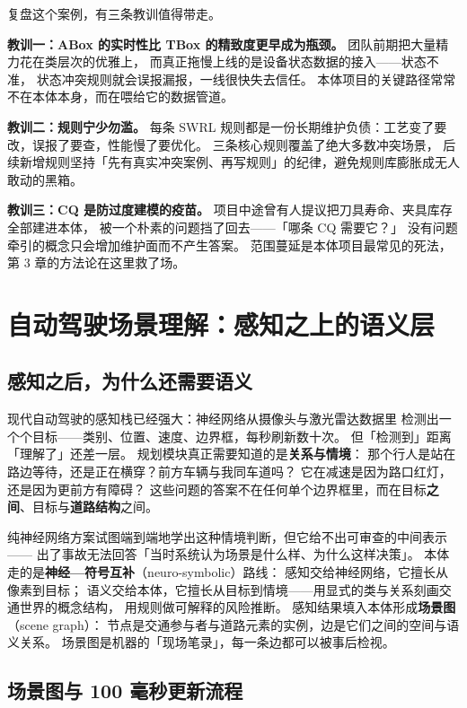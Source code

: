 复盘这个案例，有三条教训值得带走。

\textbf{教训一：ABox 的实时性比 TBox 的精致度更早成为瓶颈。}
团队前期把大量精力花在类层次的优雅上，
而真正拖慢上线的是设备状态数据的接入——状态不准，
状态冲突规则就会误报漏报，一线很快失去信任。
本体项目的关键路径常常不在本体本身，而在喂给它的数据管道。

\textbf{教训二：规则宁少勿滥。}
每条 SWRL 规则都是一份长期维护负债：工艺变了要改，误报了要查，性能慢了要优化。
三条核心规则覆盖了绝大多数冲突场景，
后续新增规则坚持「先有真实冲突案例、再写规则」的纪律，避免规则库膨胀成无人敢动的黑箱。

\textbf{教训三：CQ 是防过度建模的疫苗。}
项目中途曾有人提议把刀具寿命、夹具库存全部建进本体，
被一个朴素的问题挡了回去——「哪条 CQ 需要它？」
没有问题牵引的概念只会增加维护面而不产生答案。
范围蔓延是本体项目最常见的死法，第 3 章的方法论在这里救了场。

\section{自动驾驶场景理解：感知之上的语义层}

\subsection{感知之后，为什么还需要语义}

现代自动驾驶的感知栈已经强大：神经网络从摄像头与激光雷达数据里
检测出一个个目标——类别、位置、速度、边界框，每秒刷新数十次。
但「检测到」距离「理解了」还差一层。
规划模块真正需要知道的是\textbf{关系与情境}：
那个行人是站在路边等待，还是正在横穿？前方车辆与我同车道吗？
它在减速是因为路口红灯，还是因为更前方有障碍？
这些问题的答案不在任何单个边界框里，而在目标\textbf{之间}、目标与\textbf{道路结构}之间。

纯神经网络方案试图端到端地学出这种情境判断，但它给不出可审查的中间表示——
出了事故无法回答「当时系统认为场景是什么样、为什么这样决策」。
本体走的是\textbf{神经—符号互补}（neuro-symbolic）路线：
感知交给神经网络，它擅长从像素到目标；
语义交给本体，它擅长从目标到情境——用显式的类与关系刻画交通世界的概念结构，
用规则做可解释的风险推断。
感知结果填入本体形成\textbf{场景图}（scene graph）：
节点是交通参与者与道路元素的实例，边是它们之间的空间与语义关系。
场景图是机器的「现场笔录」，每一条边都可以被事后检视。

\subsection{场景图与 100 毫秒更新流程}


